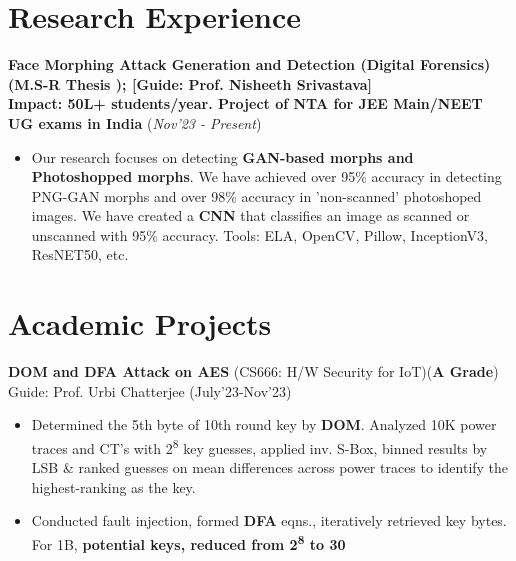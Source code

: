 \documentclass[10.8pt, a4paper]{extarticle}
\newcommand{\shorterSection}[1]{\vspace{-10pt}\section{#1}}
\begin{document}
\shorterSection{Research Experience}  
\textbf{Face Morphing Attack Generation and Detection (Digital Forensics) (M.S-R Thesis );  [Guide: Prof. Nisheeth Srivastava] } 
\vspace{2.8pt}
\\\textbf{Impact: 50L+ students/year. Project of NTA for JEE Main/NEET UG exams in India}
\hfill\hfill(\textit{Nov'23 - Present})

\begin{itemize}  

          \item Our research focuses on detecting \textbf{GAN-based morphs and Photoshopped morphs}. We have achieved over 95\% accuracy in detecting PNG-GAN morphs and over 98\% accuracy in 'non-scanned' photoshoped images. We have created a \textbf{CNN} that classifies an image as scanned or unscanned with 95\% accuracy. Tools: ELA, OpenCV, Pillow, InceptionV3, ResNET50, etc.\\[-0.6cm]
        
          
    \end{itemize}




\vspace{4pt}
\shorterSection{Academic Projects}
\vspace{2pt}

\textbf{DOM and DFA Attack on AES} (CS666: H/W Security for IoT)(\textbf{A Grade}) Guide: Prof. Urbi Chatterjee \href{https://github.com/souvikcseiitk/CS666-Hardware-Security-for-Internet-of-Things/tree/main/Assignment%203}{\faGithub{}}  \hfill(July'23-Nov'23)
	\\[-0.6cm]

 \begin{itemize}
\item  Determined the 5th byte of 10th round key by \textbf{DOM}. Analyzed 10K power traces and CT's with 2\textsuperscript{8} key guesses, applied inv. S-Box, binned results by LSB \& ranked guesses on mean differences across power traces to identify the highest-ranking as the key. \\[-0.6cm]
\item Conducted fault injection, formed \textbf{DFA} eqns., iteratively retrieved key bytes. For 1B, \textbf{potential keys, reduced from 2\textsuperscript{8} to 30} \\[-0.6cm]
\end{itemize}
\end{document}
